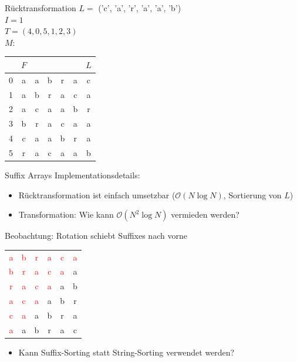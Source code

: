 \documentclass[ngerman,aspectratio=169,10pt]{beamer}
\newcommand{\red}[1]{\textcolor{red}{#1}}
\begin{document}
\begin{frame}{Rücktransformation}
    $L =$ ('c', 'a', 'r', 'a', 'a', 'b') \\
    $I=1$\\
    $T=(4, 0, 5, 1, 2, 3)$\\[7px]
    $M$:\\
    \begin{tabular}{l|c c c c c c}
        &$F$&&&&&$L$\\
        \hline
        0&a&a&b&r&a&c\\
        1&a&b&r&a&c&a\\
        2&a&c&a&a&b&r\\
        3&b&r&a&c&a&a\\
        4&c&a&a&b&r&a\\
        5&r&a&c&a&a&b\\
    \end{tabular}
\end{frame}

\begin{frame}{Suffix Arrays}
    Implementationsdetails:
    \begin{itemize}
        \item Rücktransformation ist einfach umsetzbar ($\mathcal{O}(N \log N)$, Sortierung von $L$)
        \item Transformation: Wie kann $\mathcal{O}(N^2 \log N)$ vermieden werden?
    \end{itemize}
    \pause
    
    Beobachtung: Rotation schiebt Suffixes nach vorne
    
    \begin{tabular}{cccccc}
        \red{a}&\red{b}&\red{r}&\red{a}&\red{c}&\red{a}\vline\\
        \red{b}&\red{r}&\red{a}&\red{c}&\red{a}\vline&a\\
        \red{r}&\red{a}&\red{c}&\red{a}\vline&a&b\\
        \red{a}&\red{c}&\red{a}\vline&a&b&r\\
        \red{c}&\red{a}\vline&a&b&r&a\\
        \red{a}\vline&a&b&r&a&c\\
    \end{tabular}
    
    \begin{itemize}
        \item Kann Suffix-Sorting statt String-Sorting verwendet werden?
    \end{itemize}
\end{frame}
\end{document}
